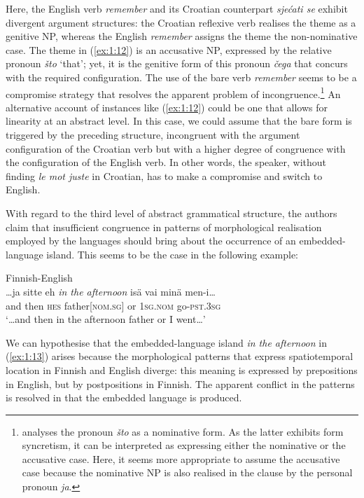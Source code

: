 \noindent Here, the English verb \textit{remember} and its Croatian counterpart \textit{sjećati se} exhibit divergent argument structures: the Croatian reflexive verb realises the theme as a genitive NP, whereas the English \textit{remember} assigns the theme the non-nominative case. The theme in (\ref{ex:1:12}) is an accusative NP, expressed by the relative pronoun \textit{što} `that'; yet, it is the genitive form of this pronoun \textit{čega} that concurs with the required configuration. The use of the bare verb \textit{remember} seems to be a compromise strategy that resolves the apparent problem of incongruence.\footnote{
\citet[213]{hlavac-second-generation-2003} analyses the pronoun \textit{što} as a nominative form. As the latter exhibits form syncretism, it can be interpreted as expressing either the nominative or the accusative case. Here, it seems more appropriate to assume the accusative case because the nominative NP is also realised in the clause by the personal pronoun \textit{ja}.}
An alternative account of instances like (\ref{ex:1:12}) could be one that allows for linearity at an abstract level. In this case, we could assume that the bare form is triggered by the preceding structure, incongruent with the argument configuration of the Croatian verb but with a higher degree of congruence with the configuration of the English verb. In other words, the speaker, without finding \textit{le mot juste} in Croatian, has to make a compromise and switch to English.

With regard to the third level of abstract grammatical structure, the authors claim that insufficient congruence in patterns of morphological realisation employed by the languages should bring about the occurrence of an embedded-language island. This seems to be the case in the following example:

\ea{\label{ex:1:13}}
Finnish-English \citep[226]{lehtinen-analysis-1966}\\
\gll \dots ja sitte eh \textit{in the afternoon} isä vai minä men-i{\dots}\\
	\phantom{\dots}and then \textsc{hes} {} father[\textsc{nom.sg}] or \textsc{1sg.nom} go-\textsc{pst.3sg}\\
\glt `\dots and then in the afternoon father or I went{\dots}'
\z

\noindent We can hypothesise that the embedded-language island \textit{in the afternoon} in (\ref{ex:1:13}) arises because the morphological patterns that express spatiotemporal location in Finnish and English diverge: this meaning is expressed by prepositions in English, but by postpositions in Finnish. The apparent conflict in the patterns is resolved in that the embedded language is produced.

